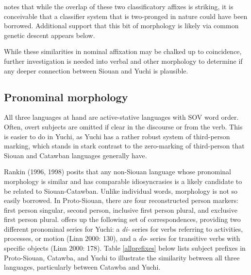 \documentclass[output=paper]{LSP/langsci}
\begin{document}
\citet{Rankin1998} notes that while the overlap of these two classificatory affixes is striking, it is conceivable that a classifier system that is two-pronged in nature could have been borrowed. Additional support that this bit of morphology is likely via common genetic descent appears below.

While these similarities in nominal affixation may be chalked up to coincidence, further investigation is needed into verbal and other morphology to determine if any deeper connection between Siouan and Yuchi is plausible.

\subsection{Pronominal morphology}

All three languages at hand are active-stative languages with SOV word order. Often, overt subjects are omitted if clear in the discourse or from the verb. This is easier to do in Yuchi, as Yuchi has a rather robust system of third-person marking, which stands in stark contrast to the zero-marking of third-person that Siouan and Catawban languages generally have.

Rankin (1996, 1998) posits that any non-Siouan language whose pronominal morphology is similar and has comparable idiosyncrasies is a likely candidate to be related to Siouan-Catawban. Unlike individual words, morphology is not so easily borrowed. In Proto-Siouan, there are four reconstructed person markers: first person singular, second person, inclusive first person plural, and exclusive first person plural. \citet{Rankin1998} offers up the following set of correspondences, providing two different pronominal series for Yuchi: a \emph{di-} series for verbs referring to activities, processes, or motion (Linn 2000: 130), and a \emph{do}- series for transitive verbs with specific objects (Linn 2000: 178). Table \ref{allprefixes} below lists subject prefixes in Proto-Siouan, Catawba, and Yuchi to illustrate the similarity between all three languages, particularly between Catawba and Yuchi.
\end{document}
